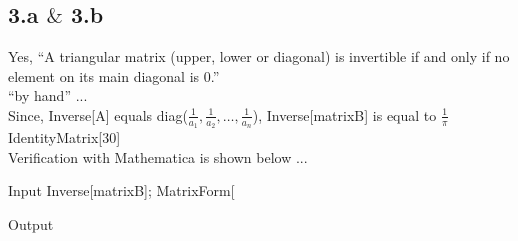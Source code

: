 \documentclass[11pt,a4paper]{article}
\begin{document}
\subsection*{3.a $\&$ 3.b}

Yes, {``}A triangular matrix (upper, lower or diagonal) is invertible if and only if no element on its main diagonal is 0.{''}\\

{``}by hand{''} ...\\
Since, Inverse[A] equals diag($\frac{1}{a_1},\frac{1}{a_2},\ldots ,\frac{1}{a_n}$), Inverse[matrixB] is equal to $\frac{1}{\pi }$IdentityMatrix[30]\\

Verification with Mathematica is shown below ...

\begin{mmaCell}[moredefined={matrixB}]{Input}
Inverse[matrixB];
MatrixForm[%
\end{mmaCell}

\begin{mmaCell}[form=MatrixForm]{Output}

\end{mmaCell}
\end{document}
